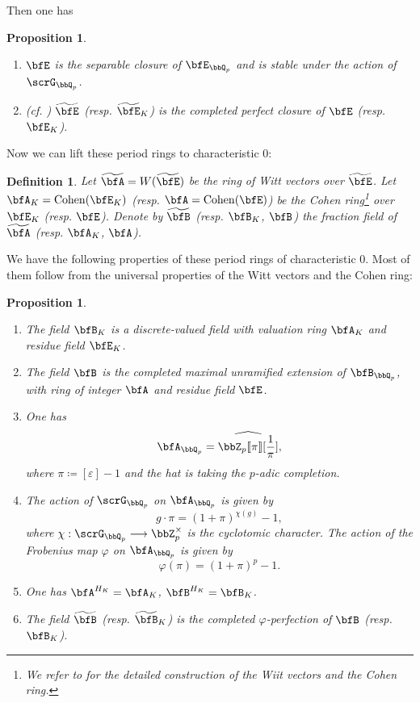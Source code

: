 \documentclass[a4paper,oneside]{amsart}
\let\opn\operatorname
\newcommand{\lto}{\longrightarrow}
\newtheorem{proposition}[theorem]{Proposition}
\newtheorem{definition}[theorem]{Definition}
\numberwithin{equation}{section}
\begin{document}
Then one has
\begin{proposition}\leavevmode
    \begin{enumerate}
        \item $\bfE$ is the separable closure of $\bfE_{\bbQ_p}$ and is stable under the action of $\scrG_{\bbQ_p}$.
        \item (cf. \cite[Corollaire 4.3.4]{wintenberger_corps_1983}) $\widetilde{\bfE}$ (resp. $\widetilde{\bfE}_K$) is the completed perfect closure of $\bfE$ (resp. $\bfE_K$).
    \end{enumerate}
\end{proposition}

Now we can lift these period rings to characteristic $0$:
\begin{definition}
    Let $\widetilde{\bfA}=W(\widetilde{\bfE})$ be the ring of Witt vectors over $\widetilde{\bfE}$. Let $\bfA_K=\opn{Cohen}(\bfE_K)$ (resp. $\bfA=\opn{Cohen}(\bfE)$) be the Cohen ring\footnote{We refer to \cite[Chapitre IX]{bourbaki_algebre_2006} for the detailed construction of the Wiit vectors and the Cohen ring.} over $\bfE_K$ (resp. $\bfE$). Denote by $\widetilde{\bfB}$ (resp. $\bfB_K$, $\bfB$) the fraction field of $\widetilde{\bfA}$ (resp. $\bfA_K$, $\bfA$).
\end{definition}

We have the following properties of these period rings of characteristic $0$. Most of them follow from the universal properties of the Witt vectors and the Cohen ring:
\begin{proposition}\leavevmode
    \begin{enumerate}
        \item The field $\bfB_K$ is a discrete-valued field with valuation ring $\bfA_K$ and residue field $\bfE_K$.
        \item The field $\bfB$ is the completed maximal unramified extension of $\bfB_{\bbQ_p}$, with ring of integer $\bfA$ and residue field $\bfE$.
        \item One has
              $$\bfA_{\bbQ_p}=\widehat{\bbZ_p\llbracket\pi\rrbracket[\frac{1}{\pi}]},$$
              where $\pi\coloneqq [\varepsilon]-1$ and the hat is taking the $p$-adic completion.
        \item The action of $\scrG_{\bbQ_p}$ on $\bfA_{\bbQ_p}$ is given by
              $$g\cdot\pi=(1+\pi)^{\chi(g)}-1,$$ where $\chi:\scrG_{\bbQ_p}\lto \bbZ_p^\times$ is the cyclotomic character. The action of the Frobenius map $\varphi$ on $\bfA_{\bbQ_p}$ is given by
              $$\varphi(\pi)=(1+\pi)^p-1.$$
        \item One has $\bfA^{H_K}=\bfA_K$, $\bfB^{H_K}=\bfB_K$.
        \item The field $\widetilde{\bfB}$ (resp. $\widetilde{\bfB}_K$) is the completed $\varphi$-perfection of $\bfB$ (resp. $\bfB_K$).
    \end{enumerate}
\end{proposition}
\end{document}
